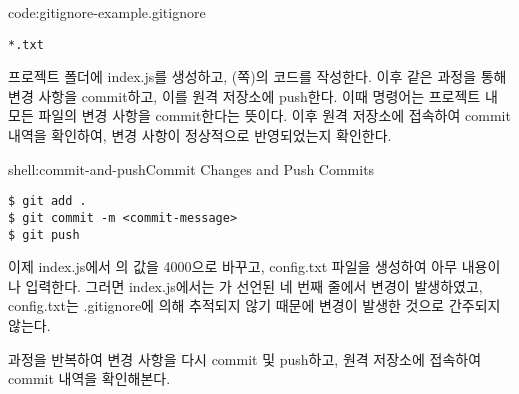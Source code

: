 \begin{codeenv}{code:gitignore-example}{.gitignore}\begin{verbatim}
*.txt
\end{verbatim}
\end{codeenv}

프로젝트 폴더에 index.js를 생성하고, (\pageref{code:nodejs-simple-web-server}쪽)의 코드를 작성한다. 이후 \와 같은 과정을 통해 변경 사항을 commit하고, 이를 원격 저장소에 push한다. 이때  명령어는 프로젝트 내 모든 파일의 변경 사항을 commit한다는 뜻이다. 이후 원격 저장소에 접속하여 commit 내역을 확인하여, 변경 사항이 정상적으로 반영되었는지 확인한다.

\begin{shellenv}{shell:commit-and-push}{Commit Changes and Push Commits}\begin{verbatim}
$ git add .
$ git commit -m <commit-message>
$ git push
\end{verbatim}
\end{shellenv}

이제 index.js에서 의 값을 4000으로 바꾸고, config.txt 파일을 생성하여 아무 내용이나 입력한다. 그러면 index.js에서는 가 선언된 네 번째 줄에서 변경이 발생하였고, config.txt는 .gitignore에 의해 추적되지 않기 때문에 변경이 발생한 것으로 간주되지 않는다.

 과정을 반복하여 변경 사항을 다시 commit 및 push하고, 원격 저장소에 접속하여 commit 내역을 확인해본다.
